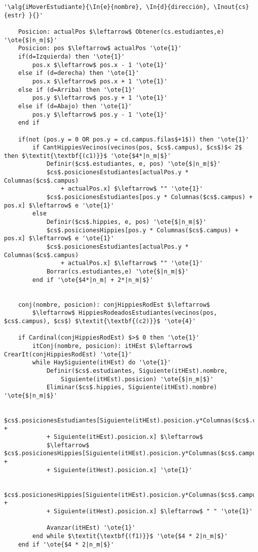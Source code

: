 \begin{lstlisting}[mathescape]
'\alg{iMoverEstudiante}{\In{e}{nombre}, \In{d}{dirección}, \Inout{cs}{estr} }{}'

	Posicion: actualPos $\leftarrow$ Obtener(cs.estudiantes,e) '\ote{$|n_m|$}'
	Posicion: pos $\leftarrow$ actualPos '\ote{1}'
	if(d=Izquierda) then '\ote{1}'
		pos.x $\leftarrow$ pos.x - 1 '\ote{1}'
	else if (d=derecha) then '\ote{1}'
		pos.x $\leftarrow$ pos.x + 1 '\ote{1}'
	else if (d=Arriba) then '\ote{1}'
		pos.y $\leftarrow$ pos.y + 1 '\ote{1}'
 	else if (d=Abajo) then '\ote{1}'
 		pos.y $\leftarrow$ pos.y - 1 '\ote{1}'
 	end if

 	if(not (pos.y = 0 OR pos.y = cd.campus.filas$+1$)) then '\ote{1}'
		if CantHippiesVecinos(vecinos(pos, $cs$.campus), $cs$)$< 2$  then $\textit{\textbf{(c1)}}$ '\ote{$4*|n_m|$}'
			Definir($cs$.estudiantes, e, pos) '\ote{$|n_m|$}'
			$cs$.posicionesEstudiantes[actualPos.y * Columnas($cs$.campus)
				+ actualPos.x] $\leftarrow$ "" '\ote{1}'
			$cs$.posicionesEstudiantes[pos.y * Columnas($cs$.campus) + pos.x] $\leftarrow$ e '\ote{1}'
		else
			Definir($cs$.hippies, e, pos) '\ote{$|n_m|$}'
			$cs$.posicionesHippies[pos.y * Columnas($cs$.campus) + pos.x] $\leftarrow$ e '\ote{1}'
			$cs$.posicionesEstudiantes[actualPos.y * Columnas($cs$.campus)
				+ actualPos.x] $\leftarrow$ "" '\ote{1}'
			Borrar(cs.estudiantes,e) '\ote{$|n_m|$}'
		end if '\ote{$4*|n_m| + 2*|n_m|$}'


	conj(nombre, posicion): conjHippiesRodEst $\leftarrow$
		$\leftarrow$ HippiesRodeadosEstudiantes(vecinos(pos, $cs$.campus), $cs$) $\textit{\textbf{(c2)}}$ '\ote{4}'

	if Cardinal(conjHippiesRodEst) $>$ 0 then '\ote{1}'
		itConj(nombre, posicion): itHEst $\leftarrow$ CrearIt(conjHippiesRodEst) '\ote{1}'
		while HaySiguiente(itHEst) do '\ote{1}'
			Definir($cs$.estudiantes, Siguiente(itHEst).nombre,
				Siguiente(itHEst).posicion) '\ote{$|n_m|$}'
			Eliminar($cs$.hippies, Siguiente(itHEst).nombre) '\ote{$|n_m|$}'

			$cs$.posicionesEstudiantes[Siguiente(itHEst).posicion.y*Columnas($cs$.campus) +
			+ Siguiente(itHEst).posicion.x] $\leftarrow$
			$\leftarrow$ $cs$.posicionesHippies[Siguiente(itHEst).posicion.y*Columnas($cs$.campus) +
			+ Siguiente(itHest).posicion.x] '\ote{1}'

			$cs$.posicionesHippies[Siguiente(itHEst).posicion.y*Columnas($cs$.campus) +
			+ Siguiente(itHest).posicion.x] $\leftarrow$ " " '\ote{1}'

			Avanzar(itHEst) '\ote{1}'
		end while $\textit{\textbf{(f1)}}$ '\ote{$4 * 2|n_m|$}'
	end if '\ote{$4 * 2|n_m|$}'



\end{lstlisting}
